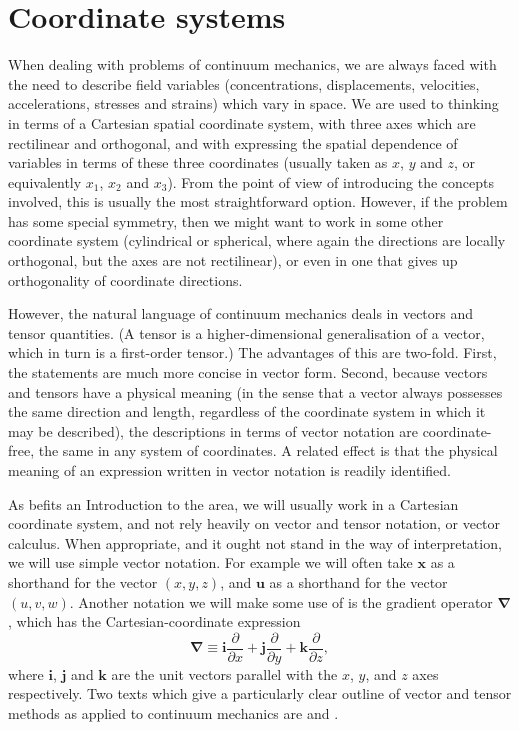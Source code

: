 \documentclass[twoside,11pt]		{report}
\begin{document}
\section{Coordinate systems}

When dealing with problems of continuum mechanics, we are always faced
with the need to describe field variables (concentrations,
displacements, velocities, accelerations, stresses and strains) which
vary in space. We are used to thinking in terms of a Cartesian spatial
coordinate system, with three axes which are rectilinear and
orthogonal, and with expressing the spatial dependence of variables in
terms of these three coordinates (usually taken as $x$, $y$ and $z$,
or equivalently $x_1$, $x_2$ and $x_3$). From the point of view of
introducing the concepts involved, this is usually the most
straightforward option. However, if the problem has some special
symmetry, then we might want to work in some other coordinate system
(\eg cylindrical or spherical, where again the directions are locally
orthogonal, but the axes are not rectilinear), or even in one that
gives up orthogonality of coordinate directions.

However, the natural language of continuum mechanics deals in vectors
and tensor quantities. (A tensor is a higher-dimensional generalisation
of a vector, which in turn is a first-order tensor.) The advantages of
this are two-fold. First, the statements are much more concise in
vector form. Second, because vectors and tensors have a physical
meaning (in the sense that a vector always possesses the same
direction and length, regardless of the coordinate system in which it
may be described), the descriptions in terms of vector notation are
coordinate-free, \ie the same in any system of coordinates. A related
effect is that the physical meaning of an expression written in vector
notation is readily identified.

As befits an Introduction to the area, we will usually work in a
Cartesian coordinate system, and not rely heavily on vector and tensor
notation, or vector calculus. When appropriate, and it ought not stand
in the way of interpretation, we will use simple vector notation. For
example we will often take $\bm{x}$ as a shorthand for the vector $(x,
y, z)$, and $\bm{u}$ as a shorthand for the vector $(u, v,
w)$. Another notation we will make some use of is the gradient
operator $\bm{\nabla}$, which has the Cartesian-coordinate expression
\[
\bm{\nabla}\equiv\bm{i}\frac{\partial}{\partial x}+
\bm{j}\frac{\partial}{\partial y}+\bm{k}\frac{\partial}{\partial z},
\]
where $\bm{i}$, $\bm{j}$ and $\bm{k}$ are the unit vectors parallel
with the $x$, $y$, and $z$ axes respectively.  Two texts which give a
particularly clear outline of vector and tensor methods as applied to
continuum mechanics are \citet{aris62} and \citet{dan92}.
\end{document}

